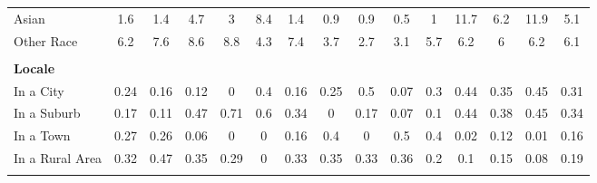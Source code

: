 \begin{tabular*}{\linewidth}{@{\extracolsep{\fill} } lcccccccccccccc}
\hspace{0.2cm}Asian&1.6&1.4&4.7&3&8.4&1.4&0.9&0.9&0.5&1&11.7&6.2&11.9&5.1\\%
\hspace{0.2cm}Other Race&6.2&7.6&8.6&8.8&4.3&7.4&3.7&2.7&3.1&5.7&6.2&6&6.2&6.1\\%
&&&&&&&&&&&&&&\\%
\multicolumn{15}{l}{\bfseries Locale}\\%
\hspace{0.2cm}In a City&0.24&0.16&0.12&0&0.4&0.16&0.25&0.5&0.07&0.3&0.44&0.35&0.45&0.31\\%
\hspace{0.2cm}In a Suburb&0.17&0.11&0.47&0.71&0.6&0.34&0&0.17&0.07&0.1&0.44&0.38&0.45&0.34\\%
\hspace{0.2cm}In a Town&0.27&0.26&0.06&0&0&0.16&0.4&0&0.5&0.4&0.02&0.12&0.01&0.16\\%
\hspace{0.2cm}In a Rural Area&0.32&0.47&0.35&0.29&0&0.33&0.35&0.33&0.36&0.2&0.1&0.15&0.08&0.19\\%
&&&&&&&&&&&&&&\\%
\hline%
\end{tabular*}